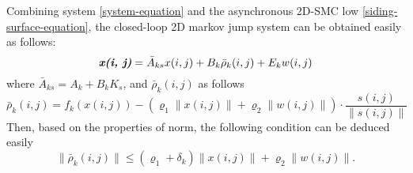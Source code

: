 \documentclass[conference]{IEEEtran}
\begin{document}
	Combining system \eqref{system-equation} and the asynchronous 2D-SMC low \eqref{siding-surface-equation}, the closed-loop 2D markov jump system can be obtained easily as follows:
	\begin{equation} \label{closed-loop-system-equation}
	\emph{\textbf{x(i, j)}} = \bar{A}_{ks}x(i,j)+B_{k}\bar{\rho}_{k}(i,j)+E_{k}w(i,j)
	\end{equation}
	where $\bar{A}_{ks} = A_{k}+B_{k}K_{s}$, and $\bar{\rho}_{k}(i,j)$ as follows
	\begin{equation*}
	\bar\rho_{k}(i,j)=f_{k}(x(i,j))-(\varrho_{1}\|x(i,j)\|+\varrho_{2}\|w(i,j)\|)\cdot\frac{s(i,j)}{\|s(i,j)\|}
	\end{equation*}
	Then, based on the properties of norm, the following condition can be deduced easily
	\begin{equation}\label{norm-rho-inequality}
	\|\bar{\rho}_{k}(i,j)\| \leq (\varrho_{1}+\delta_{k})\|x(i,j)\| + \varrho_{2}\|w(i,j)\| .
	\end{equation} 
		
\end{document}

